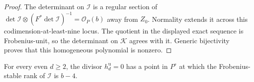 \begin{proof}
The determinant on $\mathcal I$ is a regular section of
$\det\mathcal I\otimes(F^*\det\mathcal I)^{-1}
=\mathcal O_P(b)$ away from $Z_0$.
Normality extends it across this codimension-at-least-nine locus.
The quotient in the displayed exact sequence is Frobenius-unit,
so the determinant on $\mathcal K$ agrees with it. Generic
bijectivity proves that this homogeneous polynomial is nonzero.
\end{proof}

\begin{lemma}
\label{lem:ss-even-one-loss-point}
For every even $d\ge2$, the divisor $h_d^{\mathrm u}=0$ has a
point in $P^\circ$ at which the Frobenius-stable rank of
$\mathcal I$ is $b-4$.
\end{lemma}

